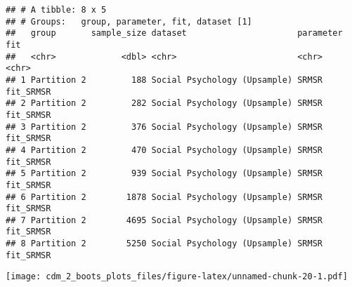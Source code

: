 \documentclass[]{article}
\newenvironment{Shaded}{\begin{snugshade}}{\end{snugshade}}
\newcommand{\CommentTok}[1]{\textcolor[rgb]{0.56,0.35,0.01}{\textit{#1}}}
\newcommand{\DataTypeTok}[1]{\textcolor[rgb]{0.13,0.29,0.53}{#1}}
\newcommand{\DecValTok}[1]{\textcolor[rgb]{0.00,0.00,0.81}{#1}}
\newcommand{\FloatTok}[1]{\textcolor[rgb]{0.00,0.00,0.81}{#1}}
\newcommand{\KeywordTok}[1]{\textcolor[rgb]{0.13,0.29,0.53}{\textbf{#1}}}
\newcommand{\NormalTok}[1]{#1}
\newcommand{\OperatorTok}[1]{\textcolor[rgb]{0.81,0.36,0.00}{\textbf{#1}}}
\newcommand{\StringTok}[1]{\textcolor[rgb]{0.31,0.60,0.02}{#1}}
\begin{document}
\begin{Shaded}
\end{Shaded}

\begin{verbatim}
## # A tibble: 8 x 5
## # Groups:   group, parameter, fit, dataset [1]
##   group       sample_size dataset                      parameter fit      
##   <chr>             <dbl> <chr>                        <chr>     <chr>    
## 1 Partition 2         188 Social Psychology (Upsample) SRMSR     fit_SRMSR
## 2 Partition 2         282 Social Psychology (Upsample) SRMSR     fit_SRMSR
## 3 Partition 2         376 Social Psychology (Upsample) SRMSR     fit_SRMSR
## 4 Partition 2         470 Social Psychology (Upsample) SRMSR     fit_SRMSR
## 5 Partition 2         939 Social Psychology (Upsample) SRMSR     fit_SRMSR
## 6 Partition 2        1878 Social Psychology (Upsample) SRMSR     fit_SRMSR
## 7 Partition 2        4695 Social Psychology (Upsample) SRMSR     fit_SRMSR
## 8 Partition 2        5250 Social Psychology (Upsample) SRMSR     fit_SRMSR
\end{verbatim}

\begin{Shaded}
\end{Shaded}

\texttt{[image: cdm\_2\_boots\_plots\_files/figure-latex/unnamed-chunk-20-1.pdf]}
\end{document}
